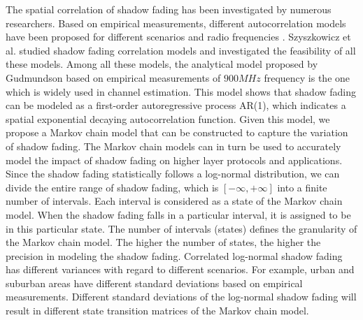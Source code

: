\par The spatial correlation of shadow fading has been investigated by numerous researchers. Based on empirical measurements, different autocorrelation models have been proposed for different scenarios and radio frequencies \cite{gudmundson1991correlation, sorensen1998correlation, weitzen2002measurement}. Szyszkowicz et al. \cite{szyszkowicz2010feasibility} studied shadow fading correlation models and investigated the feasibility of all these models. Among all these models, the analytical model proposed by Gudmundson \cite{gudmundson1991correlation} based on empirical measurements of $900MHz$ frequency is the one which is widely used in channel estimation. This model shows that shadow fading can be modeled as a first-order autoregressive process AR(1), which indicates a spatial exponential decaying autocorrelation function. Given this model, we propose a Markov chain model that can be constructed to capture the variation of shadow fading. The Markov chain models can in turn be used to accurately model the impact of shadow fading on higher layer protocols and applications. Since the shadow fading statistically follows a log-normal distribution, we can divide the entire range of shadow fading, which is $[-\infty,+\infty]$ into a finite number of intervals. Each interval is considered as a state of the Markov chain model. When the shadow fading falls in a particular interval, it is assigned to be in this particular state. The number of intervals (states) defines the granularity of the Markov chain model. The higher the number of states, the higher the precision in modeling the shadow fading. Correlated log-normal shadow fading has different variances with regard to different scenarios. For example, urban and suburban areas have different standard deviations based on empirical measurements. Different standard deviations of the log-normal shadow fading will result in different state transition matrices of the Markov chain model.
